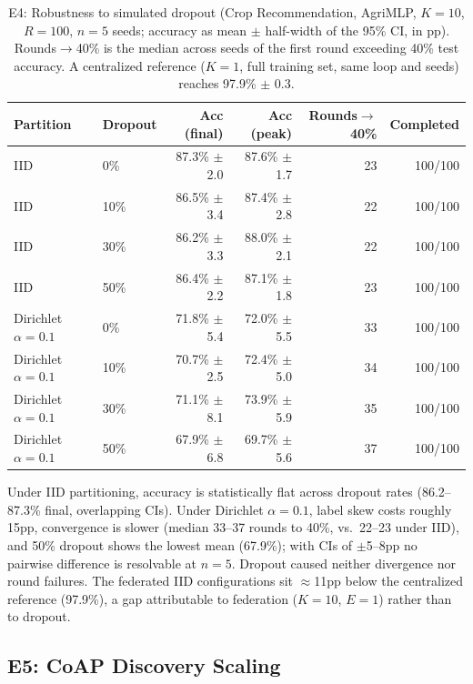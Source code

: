 \documentclass[a4paper,fleqn]{cas-dc}
\begin{document}
\begin{table}[t]
\centering
\caption{E4: Robustness to simulated dropout (Crop Recommendation, AgriMLP, $K{=}10$, $R{=}100$, $n{=}5$ seeds; accuracy as mean $\pm$ half-width of the 95\% CI, in pp). Rounds$\to$40\% is the median across seeds of the first round exceeding 40\% test accuracy. A centralized reference ($K{=}1$, full training set, same loop and seeds) reaches 97.9\% $\pm$ 0.3.}
\label{tab:e4}
\footnotesize
\begin{tabular}{l l r r r r}
\toprule
\textbf{Partition} & \textbf{Dropout} & \textbf{Acc (final)} & \textbf{Acc (peak)} & \textbf{Rounds$\to$40\%} & \textbf{Completed} \\
\midrule
IID & 0\%  & 87.3\% $\pm$ 2.0 & 87.6\% $\pm$ 1.7 & 23 & 100/100 \\
IID & 10\% & 86.5\% $\pm$ 3.4 & 87.4\% $\pm$ 2.8 & 22 & 100/100 \\
IID & 30\% & 86.2\% $\pm$ 3.3 & 88.0\% $\pm$ 2.1 & 22 & 100/100 \\
IID & 50\% & 86.4\% $\pm$ 2.2 & 87.1\% $\pm$ 1.8 & 23 & 100/100 \\
\midrule
Dirichlet $\alpha{=}0.1$ & 0\%  & 71.8\% $\pm$ 5.4 & 72.0\% $\pm$ 5.5 & 33 & 100/100 \\
Dirichlet $\alpha{=}0.1$ & 10\% & 70.7\% $\pm$ 2.5 & 72.4\% $\pm$ 5.0 & 34 & 100/100 \\
Dirichlet $\alpha{=}0.1$ & 30\% & 71.1\% $\pm$ 8.1 & 73.9\% $\pm$ 5.9 & 35 & 100/100 \\
Dirichlet $\alpha{=}0.1$ & 50\% & 67.9\% $\pm$ 6.8 & 69.7\% $\pm$ 5.6 & 37 & 100/100 \\
\bottomrule
\end{tabular}
\end{table}

Under IID partitioning, accuracy is statistically flat across dropout rates (86.2--87.3\% final, overlapping CIs). Under Dirichlet $\alpha{=}0.1$, label skew costs roughly 15pp, convergence is slower (median 33--37 rounds to 40\%, vs.\ 22--23 under IID), and 50\% dropout shows the lowest mean (67.9\%); with CIs of $\pm$5--8pp no pairwise difference is resolvable at $n{=}5$. Dropout caused neither divergence nor round failures. The federated IID configurations sit $\approx$11pp below the centralized reference (97.9\%), a gap attributable to federation ($K{=}10$, $E{=}1$) rather than to dropout.

\subsection{E5: CoAP Discovery Scaling}
\label{sec:e5}
\end{document}
